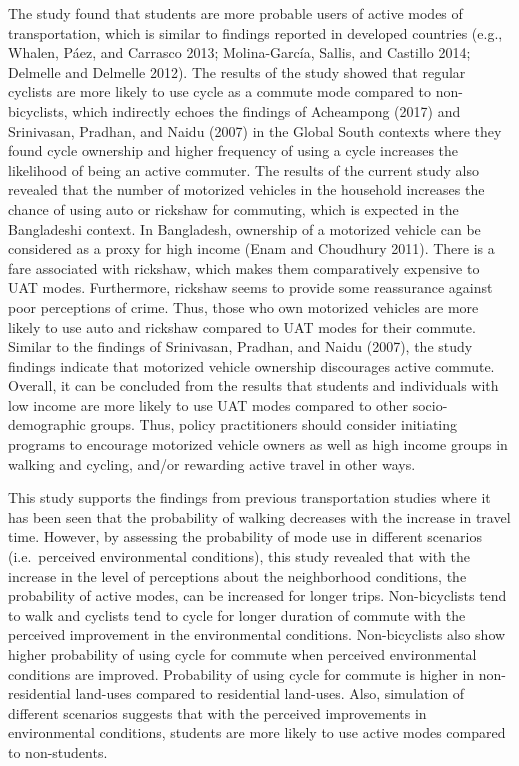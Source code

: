 \documentclass[]{elsarticle} %
\begin{document}
The study found that students are more probable users of active modes of
transportation, which is similar to findings reported in developed
countries (e.g., Whalen, Páez, and Carrasco 2013; Molina-García, Sallis,
and Castillo 2014; Delmelle and Delmelle 2012). The results of the study
showed that regular cyclists are more likely to use cycle as a commute
mode compared to non-bicyclists, which indirectly echoes the findings of
Acheampong (2017) and Srinivasan, Pradhan, and Naidu (2007) in the
Global South contexts where they found cycle ownership and higher
frequency of using a cycle increases the likelihood of being an active
commuter. The results of the current study also revealed that the number
of motorized vehicles in the household increases the chance of using
auto or rickshaw for commuting, which is expected in the Bangladeshi
context. In Bangladesh, ownership of a motorized vehicle can be
considered as a proxy for high income (Enam and Choudhury 2011). There
is a fare associated with rickshaw, which makes them comparatively
expensive to UAT modes. Furthermore, rickshaw seems to provide some
reassurance against poor perceptions of crime. Thus, those who own
motorized vehicles are more likely to use auto and rickshaw compared to
UAT modes for their commute. Similar to the findings of Srinivasan,
Pradhan, and Naidu (2007), the study findings indicate that motorized
vehicle ownership discourages active commute. Overall, it can be
concluded from the results that students and individuals with low income
are more likely to use UAT modes compared to other socio-demographic
groups. Thus, policy practitioners should consider initiating programs
to encourage motorized vehicle owners as well as high income groups in
walking and cycling, and/or rewarding active travel in other ways.

This study supports the findings from previous transportation studies
where it has been seen that the probability of walking decreases with
the increase in travel time. However, by assessing the probability of
mode use in different scenarios (i.e.~perceived environmental
conditions), this study revealed that with the increase in the level of
perceptions about the neighborhood conditions, the probability of active
modes, can be increased for longer trips. Non-bicyclists tend to walk
and cyclists tend to cycle for longer duration of commute with the
perceived improvement in the environmental conditions. Non-bicyclists
also show higher probability of using cycle for commute when perceived
environmental conditions are improved. Probability of using cycle for
commute is higher in non-residential land-uses compared to residential
land-uses. Also, simulation of different scenarios suggests that with
the perceived improvements in environmental conditions, students are
more likely to use active modes compared to non-students.
\end{document}
